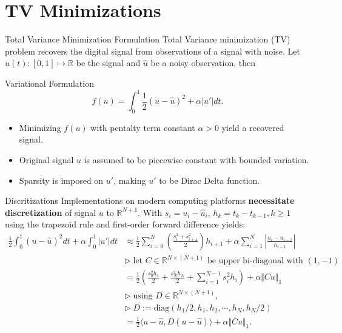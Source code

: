 \documentclass[11pt]{beamer}
\theoremstyle{definition}
\begin{document}
\section{TV Minimizations}
    \begin{frame}{Total Variance Minimization Formulation}
        Total Variance minimization (TV) problem recovers the digital signal from observations of a signal with noise. 
        Let $u(t):[0, 1]\mapsto \mathbb R$ be the signal and $\hat u$ be a noisy observation, then
        \begin{block}{Variational Formulation}
            \[
                f(u) = \int_0^1 \frac{1}{2} 
                (u - \hat u)^2 + \alpha |u'|dt. 
            \]    
        \end{block}
        \begin{itemize}
            \item Minimizing $f(u)$ with pentalty term constant $\alpha > 0$ yield a recovered signal. 
            \item Original signal $u$ is assumed to be piecewise constant with bounded variation. 
            \item Sparsity is imposed on $u'$, making $u'$ to be Dirac Delta function. 
        \end{itemize}
        
    \end{frame}
    \begin{frame}{Discritizations}
        Implementations on modern computing platforms \textbf{necessitate discretization} of signal $u$ to $\mathbb R^{N + 1}$. 
        With $s_i = u_i - \hat u_i$, $h_k = t_k - t_{k -1}, k\ge 1$ using the trapezoid rule and first-order forward difference yields:
        {\scriptsize
        \begin{align*}
            \frac{1}{2}\int_{0}^{1} (u - \hat u)^2 dt + 
            \alpha \int_0^1 |u'| dt
            &\approx
            \frac{1}{2}
            \sum_{i = 0}^{N}
            \left(
                \frac{s_i^2 + s_{i + 1}^2}{2}
            \right)h_{i + 1}
            + 
            \alpha
            \sum_{i = 1}^{N}
            \left|
                \frac{u_{i} - u_{i - 1}}{h_{i + 1}}
            \right|
            \\
            & \triangleright\; \text{let } 
            C\in \mathbb R^{N\times (N + 1)} \text{ be upper bi-diagonal with }(1, -1)
            \\
            &= \frac{1}{2}\left(
                \frac{s_0^2h_1}{2} + \frac{s_N^2h_N}{2}
                + 
                \sum_{i = 1}^{N - 1}s_i^2 h_i
            \right) + \alpha\Vert Cu\Vert_1
            \\
            & 
            \triangleright \; \text{using } D\in \mathbb R^{N \times (N + 1)},
            \\
            & \triangleright\; D := \text{diag}(h_1/2, h_1, h_2, \cdots, h_N, h_N/2)
            \\
            &= 
            \frac{1}{2}\langle u - \hat u, D(u - \hat u)\rangle + \alpha \Vert Cu\Vert_1. 
        \end{align*}
        }
    \end{frame}
\end{document}

